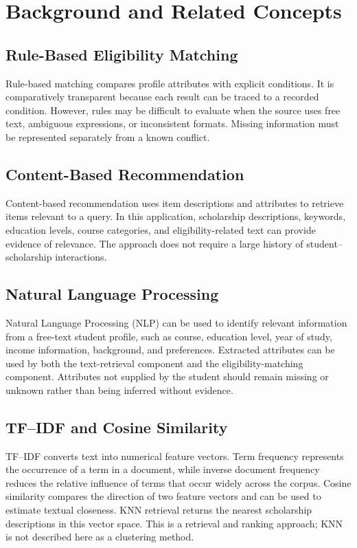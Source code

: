 \documentclass[conference]{IEEEtran}
\begin{document}
\section{Background and Related Concepts}
\subsection{Rule-Based Eligibility Matching}
Rule-based matching compares profile attributes with explicit conditions. It is comparatively transparent because each result can be traced to a recorded condition. However, rules may be difficult to evaluate when the source uses free text, ambiguous expressions, or inconsistent formats. Missing information must be represented separately from a known conflict.

\subsection{Content-Based Recommendation}
Content-based recommendation uses item descriptions and attributes to retrieve items relevant to a query. In this application, scholarship descriptions, keywords, education levels, course categories, and eligibility-related text can provide evidence of relevance. The approach does not require a large history of student--scholarship interactions.

\subsection{Natural Language Processing}
Natural Language Processing (NLP) can be used to identify relevant information from a free-text student profile, such as course, education level, year of study, income information, background, and preferences. Extracted attributes can be used by both the text-retrieval component and the eligibility-matching component. Attributes not supplied by the student should remain missing or unknown rather than being inferred without evidence.

\subsection{TF--IDF and Cosine Similarity}
TF--IDF converts text into numerical feature vectors. Term frequency represents the occurrence of a term in a document, while inverse document frequency reduces the relative influence of terms that occur widely across the corpus. Cosine similarity compares the direction of two feature vectors and can be used to estimate textual closeness. KNN retrieval returns the nearest scholarship descriptions in this vector space. This is a retrieval and ranking approach; KNN is not described here as a clustering method.
\end{document}
